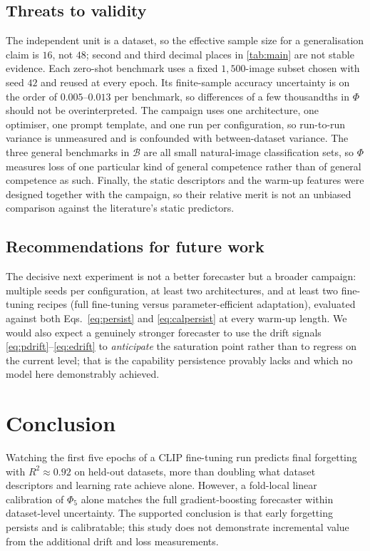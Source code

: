 \documentclass[manuscript,nonacm]{acmart}
\begin{document}
\subsection{Threats to validity}
The independent unit is a dataset, so the effective sample size for a generalisation
claim is $16$, not $48$; second and third decimal places in \cref{tab:main} are not
stable evidence. Each zero-shot benchmark uses a fixed $1{,}500$-image subset chosen
with seed $42$ and reused at every epoch. Its finite-sample accuracy uncertainty is on
the order of $0.005$--$0.013$ per benchmark, so differences of a few thousandths in
$\Phi$ should not be overinterpreted. The campaign uses one architecture, one optimiser,
one prompt template, and one run per configuration, so run-to-run variance is
unmeasured and is confounded with between-dataset variance. The three general benchmarks
in $\mathcal{B}$ are all small natural-image classification sets, so $\Phi$ measures loss
of one particular kind of general competence rather than of general competence as such.
Finally, the static descriptors and the warm-up features were designed together with the
campaign, so their relative merit is not an unbiased comparison against the literature's
static predictors.

\subsection{Recommendations for future work}
The decisive next experiment is not a better forecaster but a broader campaign:
multiple seeds per configuration, at least two architectures, and at least two
fine-tuning recipes (full fine-tuning versus parameter-efficient adaptation), evaluated
against both Eqs.~\eqref{eq:persist} and \eqref{eq:calpersist} at every warm-up length. We
would also expect a genuinely stronger forecaster to use the drift signals
\eqref{eq:pdrift}--\eqref{eq:edrift} to \emph{anticipate} the saturation point rather
than to regress on the current level; that is the capability persistence provably lacks
and which no model here demonstrably achieved.

\section{Conclusion}
Watching the first five epochs of a CLIP fine-tuning run predicts final forgetting with
$R^2\approx0.92$ on held-out datasets, more than doubling what dataset descriptors and
learning rate achieve alone. However, a fold-local linear calibration of $\Phi_5$ alone
matches the full gradient-boosting forecaster within dataset-level uncertainty. The
supported conclusion is that early forgetting persists and is calibratable; this study
does not demonstrate incremental value from the additional drift and loss measurements.
\end{document}
